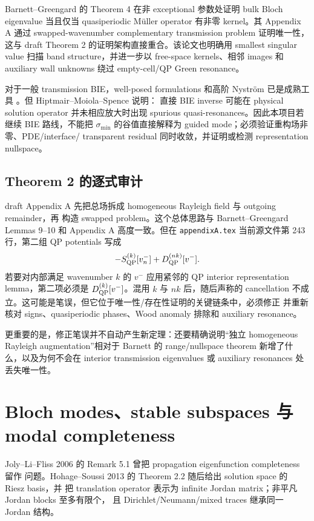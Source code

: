 \documentclass[UTF8,11pt,fontset=none]{ctexart}
\begin{document}
Barnett--Greengard 的 Theorem 4 在非 exceptional 参数处证明 bulk Bloch eigenvalue
当且仅当 quasiperiodic Müller operator 有非零 kernel\cite{BarnettGreengard2010}。其
Appendix A 通过 swapped-wavenumber complementary transmission problem 证明唯一性，
这与 draft Theorem 2 的证明架构直接重合。该论文也明确用 smallest singular value
扫描 band structure，并进一步以 free-space kernels、相邻 images 和 auxiliary wall
unknowns 绕过 empty-cell/QP Green resonance。

对于一般 transmission BIE，well-posed formulations 和高阶 Nyström 已是成熟工具
\cite{DominguezLyonTurc2016,HaoEtAl2014,Kress1991}。但 Hiptmair--Moiola--Spence 说明：
直接 BIE inverse 可能在 physical solution operator 并未相应放大时出现 spurious
quasi-resonances\cite{HiptmairMoiolaSpence2022}。因此本项目若继续 BIE 路线，不能把
\(\sigma_{\min}\) 的谷值直接解释为 guided mode；必须验证重构场非零、PDE/interface/
transparent residual 同时收敛，并证明或检测 representation nullspace。

\subsection{Theorem 2 的逐式审计}

draft Appendix A 先把总场拆成 homogeneous Rayleigh field 与 outgoing remainder，再
构造 swapped problem。这个总体思路与 Barnett--Greengard Lemmas 9--10 和 Appendix A
高度一致。但在 \texttt{appendixA.tex} 当前源文件第 243 行，第二组 QP potentials 写成
\begin{equation}
  -S_{\rm QP}^{(k)}[v_n^-] + D_{\rm QP}^{(nk)}[v^-].
\end{equation}
若要对内部满足 wavenumber \(k\) 的 \(v^-\) 应用紧邻的 QP interior representation
lemma，第二项必须是 \(D_{\rm QP}^{(k)}[v^-]\)。混用 \(k\) 与 \(nk\) 后，随后声称的
cancellation 不成立。这可能是笔误，但它位于唯一性/存在性证明的关键链条中，必须修正
并重新核对 signs、quasiperiodic phases、Wood anomaly 排除和 auxiliary resonance。

更重要的是，修正笔误并不自动产生新定理：还要精确说明“独立 homogeneous Rayleigh
augmentation”相对于 Barnett 的 range/nullspace theorem 新增了什么，以及为何不会在
interior transmission eigenvalues 或 auxiliary resonances 处丢失唯一性。

\section{Bloch modes、stable subspaces 与 modal completeness}

Joly--Li--Fliss 2006 的 Remark 5.1 曾把 propagation eigenfunction completeness 留作
问题。Hohage--Soussi 2013 的 Theorem 2.2 随后给出 solution space 的 Riesz basis，并
把 translation operator 表示为 infinite Jordan matrix；非平凡 Jordan blocks 至多有限个，
且 Dirichlet/Neumann/mixed traces 继承同一 Jordan 结构\cite{HohageSoussi2013}。
\end{document}
